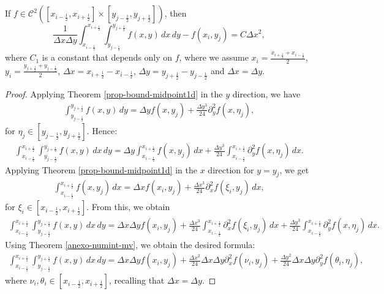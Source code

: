 \begin{thrm}
	\label{prop-bound-midpoint2d}
	If $f \in \mathcal{C}^2([x_{i-\frac{1}{2}},x_{i+\frac{1}{2}}]\times [y_{j-\frac{1}{2}},y_{j+\frac{1}{2}}])$, then 
	\begin{equation}
		\frac{1}{\Delta x \Delta y}\int_{x_{i-\frac{1}{2}}}^{x_{i+\frac{1}{2}}}
		\int_{y_{j-\frac{1}{2}}}^{y_{j+\frac{1}{2}}}{f(x,y)\,dx \,dy}-f(x_i,y_j) = C \Delta x^2, 
	\end{equation}
	where $C_1$ is a constant that depends only on $f$, where we assume $x_i = \frac{x_{i+\frac{1}{2}} + x_{i-\frac{1}{2}}}{2}$,
	$y_i = \frac{y_{j+\frac{1}{2}} + y_{j-\frac{1}{2}}}{2}$, $\Delta x = x_{i+\frac{1}{2}}-x_{i-\frac{1}{2}}$,
	$\Delta y= y_{j+\frac{1}{2}}-y_{j-\frac{1}{2}}$ and $\Delta x = \Delta y$.
\end{thrm}
\begin{proof}
	Applying Theorem \ref{prop-bound-midpoint1d} in the $y$ direction, we have
	\begin{align*}
	\int_{y_{j-\frac{1}{2}}}^{y_{j+\frac{1}{2}}} {f(x,y)\,dy} = \Delta y f(x,y_j) +
	\frac{\Delta y^3}{24}\partial_y^2 f(x, \eta_j),
	\end{align*}
	for $\eta_j\in [y_{j-\frac{1}{2}},y_{j+\frac{1}{2}}]$. Hence:
	\begin{align*}
		\int_{x_{i-\frac{1}{2}}}^{x_{i+\frac{1}{2}}}
		\int_{y_{j-\frac{1}{2}}}^{y_{j+\frac{1}{2}}} {f(x,y)\,dx \,dy} = 
		\Delta y \int_{x_{i-\frac{1}{2}}}^{x_{i+\frac{1}{2}}} {f(x,y_j) \,dx}+
		\frac{\Delta y^3}{24}\int_{x_{i-\frac{1}{2}}}^{x_{i+\frac{1}{2}}} {\partial_y^2 f(x, \eta_j)\,dx}.
	\end{align*}
	Applying Theorem \ref{prop-bound-midpoint1d} in the $x$ direction for $y=y_j$, we get
	\begin{align*}
	\int_{x_{i-\frac{1}{2}}}^{x_{i+\frac{1}{2}}} {f(x,y_j)\,dx} = 
	\Delta x {f(x_i,y_j)}+
	\frac{\Delta x^3}{24} {\partial_x^2 f(\xi_i, y_j)\,dx},
	\end{align*}
	for $\xi_i\in [x_{i-\frac{1}{2}},x_{i+\frac{1}{2}}]$. From this, we obtain
	\begin{align*}
	\int_{x_{i-\frac{1}{2}}}^{x_{i+\frac{1}{2}}}
	\int_{y_{j-\frac{1}{2}}}^{y_{j+\frac{1}{2}}} {f(x,y)\,dx \,dy} = 
	\Delta x \Delta y f(x_i,y_j)+
	\frac{\Delta x^3}{24}\int_{x_{i-\frac{1}{2}}}^{x_{i+\frac{1}{2}}} {\partial_x^2 f(\xi_i, y_j)\,dx}+
	\frac{\Delta y^3}{24}\int_{x_{i-\frac{1}{2}}}^{x_{i+\frac{1}{2}}} {\partial_y^2 f(x, \eta_j)\,dx}.
\end{align*}
Using Theorem \ref{anexo-numint-mv}, we obtain the desired formula:
	\begin{align*}
	\int_{x_{i-\frac{1}{2}}}^{x_{i+\frac{1}{2}}}
	\int_{y_{j-\frac{1}{2}}}^{y_{j+\frac{1}{2}}} {f(x,y)\,dx \,dy} = 
	\Delta x \Delta y f(x_i,y_j)+
	\frac{\Delta x^2}{24}\Delta x \Delta y {\partial_x^2 f(\nu_i, y_j)}+
	\frac{\Delta y^2}{24}\Delta x \Delta y {\partial_y^2 f(\theta_i, \eta_j)},
\end{align*}
where $\nu_i, \theta_i\in [x_{i-\frac{1}{2}},x_{i+\frac{1}{2}}]$, recalling that $\Delta x = \Delta y$.
\end{proof}

